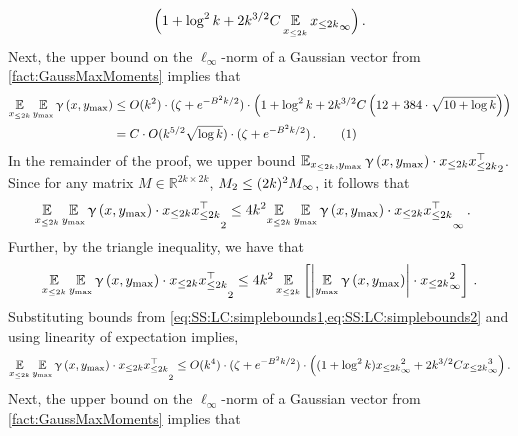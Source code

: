 \documentclass[11pt,letterpaper]{article}
\theoremstyle{plain}
\theoremstyle{definition}
\theoremstyle{remark}
\newcommand{\yesnum}{\addtocounter{equation}{1}\tag{\theequation}}
\def\abs#1{\left| #1 \right|}
\newcommand{\inparen}[1]{\ensuremath{\left(#1\right)}}
\newcommand{\insquare}[1]{\ensuremath{\left[#1\right]}}
\let\norm\relax
\newcommand{\norm}[1]{\ensuremath{\left\lVert #1 \right\rVert}}
\newcommand{\R}{\mathbb{R}}
\newcommand{\E}{\operatornamewithlimits{\mathbb{E}}}
\newcommand{\Ex}{\E}
\renewcommand{\gamma}{\upgamma}
\newcommand{\ymax}{y_{\max}}
\begin{document}
{{\begin{align*}
            \Bigl(1 + \log^2{k} + 2k^{3/2}C \Ex_{x_{\leq 2k}}\norm{x_{\leq 2k}}_\infty \Bigr)\,.
    \end{align*}
    Next, the upper bound on the $\ell_\infty$-norm of a Gaussian vector from \cref{fact:GaussMaxMoments} implies that 
    \begin{align*}
        \Ex_{x_{\leq 2k}}\Ex_{\ymax}{\gamma\inparen{x,\ymax}}
        &\leq 
        O(k^2)\cdot
                (\zeta + e^{-B^2 k/2})\cdot
            \Bigl(
                1 
                + \log^2{k} 
                + 2k^{3/2}C 
                    \inparen{12+384\cdot\sqrt{10+\log{k}}}
            \Bigr)\\
        &= C\cdot 
            O(k^{5/2}\sqrt{\log{k}}) \cdot
            (\zeta + e^{-B^2 k/2})
        \,.
        \yesnum\label{eq:SS:LC:part2:spectral1}
    \end{align*}
    In the remainder of the proof, we upper bound $\norm{\Ex_{x_{\leq 2k}, \ymax}{
                \gamma\inparen{x,\ymax}
            }\cdot  x_{\leq 2k}x_{\leq 2k}^\top}_2$.
    Since for any matrix $M\in \R^{2k\times 2k}$, $\norm{M}_2\leq (2k)^2\norm{M}_\infty$, it follows that 
    \begin{align*}
        \norm{\Ex_{x_{\leq 2k}}\Ex_{\ymax}{
                \gamma\inparen{x,\ymax}
            }\cdot  x_{\leq 2k}x_{\leq 2k}^\top}_2
        &\leq 4k^2 \norm{\Ex_{x_{\leq 2k}}\Ex_{\ymax}{
                \gamma\inparen{x,\ymax}
            }\cdot  x_{\leq 2k}x_{\leq 2k}^\top}_\infty\,.
    \end{align*} 
    Further, by the triangle inequality, we have that 
    \begin{align*}
        \norm{\Ex_{x_{\leq 2k}}\Ex_{\ymax}{
                \gamma\inparen{x,\ymax}
            }\cdot  x_{\leq 2k}x_{\leq 2k}^\top}_2
        \leq 4k^2 \Ex_{x_{\leq 2k}}\insquare{\abs{\Ex_{\ymax}{
                \gamma\inparen{x,\ymax}
            }} \cdot \norm{x_{\leq 2k}}_\infty^2}\,.
    \end{align*}
    Substituting bounds from \cref{eq:SS:LC:simplebounds1,eq:SS:LC:simplebounds2} and using linearity of expectation implies, 
    \[
        \norm{\Ex_{x_{\leq 2k}}\Ex_{\ymax}{
                \gamma\inparen{x,\ymax}
            }\cdot  x_{\leq 2k}x_{\leq 2k}^\top}_2
        \leq 
        O(k^4)\cdot
            (\zeta + e^{-B^2 k/2})\cdot
            \Bigl(
                (1 + \log^2{k})\norm{x_{\leq 2k}}_\infty^2
                + 
                2k^{3/2}C \norm{x_{\leq 2k}}_\infty^3 
            \Bigr)\,.
    \]
    Next, the upper bound on the $\ell_\infty$-norm of a Gaussian vector from \cref{fact:GaussMaxMoments} implies that 
}}
\end{document}
